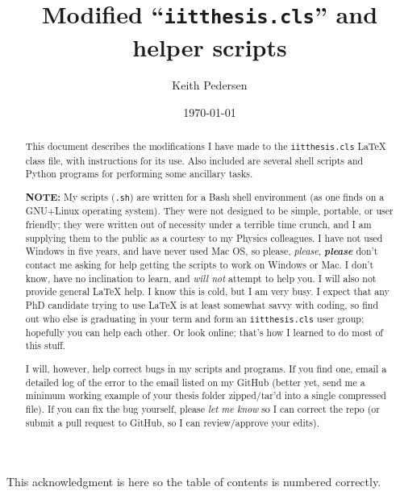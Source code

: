 \documentclass{iitthesis}
\begin{document}
\title{Modified ``{\tt iitthesis.cls}'' and helper scripts}


\author{Keith Pedersen}
\date{\today} %

\signaturetrue
\maketitle

\prelimpages

\begin{acknowledgement}     %

	This acknowledgment is here so the table of contents is numbered correctly.
\end{acknowledgement}

\tableofcontents
\clearpage

\listoffigures
\clearpage

\begin{abstract}
	
	This document describes the modifications I have made to the 
	{\tt iitthesis.cls} \LaTeX{} class file, with instructions for its use.
	Also included are several shell scripts and Python programs for 
	performing some ancillary tasks.
		
	{\bf NOTE:} My scripts ({\tt *.sh}) are written for a Bash shell environment 
	(as one finds on a GNU+Linux operating system).
	They were not designed to be simple, portable, or user friendly;
	they were written out of necessity under a terrible time crunch, 
	and I am supplying them to the public as a courtesy to my Physics colleagues.
	I have not used Windows in five years, and have never used Mac OS, 
	so please, \emph{please}, \emph{\textbf{please}} don't contact me 
	asking for help getting the scripts to work on Windows or Mac. 
	I don't know, have no inclination to learn, 
	and \emph{will not} attempt to help you. 
	I will also not provide general \LaTeX{} help.
	I know this is cold, but I am very busy.
	I expect that any PhD candidate trying to use \LaTeX{} is at least
	somewhat savvy with coding, so find out who else is graduating in your term and 
	form an {\tt iitthesis.cls} user group; hopefully you can help each other.
	Or look online; that's how I learned to do most of this stuff.
		
	I will, however, help correct bugs in my scripts and programs.
	If you find one, email a detailed log of the error to the email listed on my GitHub	
	(better yet, send me a minimum working example of your thesis folder
	zipped/tar'd into a single compressed file). 
	If you can fix the bug yourself, please \emph{let me know} so I can correct the repo
	(or submit a pull request to GitHub, so I can review/approve your edits).
\end{abstract}
\end{document}
